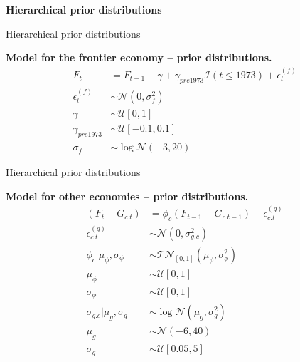 \documentclass[notes,blackandwhite,mathsans,usenames,dvipsnames]{beamer}
\begin{document}
{
\begin{frame}

\begin{adjustwidth}{-0.5cm}{0cm}
\vspace{8.3cm}\Large
\textbf{{\color{gre}Hierarchical} {\color{yel}prior distributions}}
\end{adjustwidth}

\end{frame}
}


\begin{frame}{Hierarchical prior distributions}

\textbf{Model for the frontier economy -- prior distributions.}
\begin{align*}
F_t &= F_{t-1} + \gamma +\gamma_{pre 1973}\mathcal{I}(t\leq 1973) + \epsilon_t^{(f)}\\
\epsilon_t^{(f)} &\sim\mathcal{N}\left( 0,\sigma_f^2 \right)\\[2ex]
\gamma &\sim\mathcal{U}[0,1]\\
\gamma_{pre 1973} &\sim\mathcal{U}[-0.1,0.1]\\
\sigma_f &\sim\log\mathcal{N}(-3,20)
\end{align*}


\end{frame}



\begin{frame}{Hierarchical prior distributions}

\textbf{Model for other economies -- prior distributions.}
\begin{align*}
(F_t - G_{c.t}) &= \phi_c(F_{t-1}- G_{c.t-1}) + \epsilon_{c.t}^{(g)}\\
\epsilon_{c.t}^{(g)} &\sim\mathcal{N}\left( 0,\sigma_{g.c}^2 \right)\\[2ex]
\phi_c|\mu_\phi, \sigma_\phi &\sim\mathcal{TN}_{[0,1]}\left(\mu_\phi, \sigma_\phi^2\right)\\
\mu_\phi &\sim\mathcal{U}[0,1] \\
\sigma_\phi &\sim \mathcal{U}[0,1]\\[2ex]
\sigma_{g.c}|\mu_g,\sigma_g &\sim\log\mathcal{N}\left(\mu_g,\sigma_g^{2}\right)\\
\mu_g &\sim\mathcal{N}\left( -6,40 \right)\\
\sigma_g & \sim \mathcal{U}[0.05,5]
\end{align*}

\end{frame}
\end{document}
